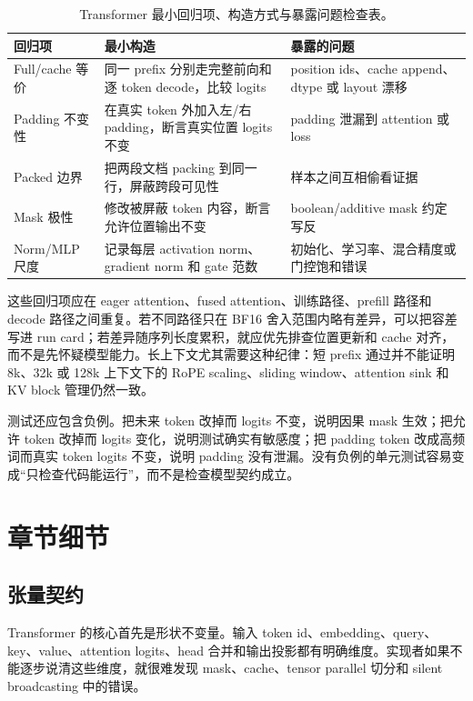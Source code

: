 \documentclass[UTF8,zihao=-4,openany]{ctexbook}
\begin{document}
\begin{table}[t]
\centering
\small
\begin{tabular}{@{}>{\raggedright\arraybackslash}p{}>{\raggedright\arraybackslash}p{}>{\raggedright\arraybackslash}p{}@{}}
\toprule
回归项 & 最小构造 & 暴露的问题 \\
\midrule
Full/cache 等价 & 同一 prefix 分别走完整前向和逐 token decode，比较 logits & position ids、cache append、dtype 或 layout 漂移 \\
Padding 不变性 & 在真实 token 外加入左/右 padding，断言真实位置 logits 不变 & padding 泄漏到 attention 或 loss \\
Packed 边界 & 把两段文档 packing 到同一行，屏蔽跨段可见性 & 样本之间互相偷看证据 \\
Mask 极性 & 修改被屏蔽 token 内容，断言允许位置输出不变 & boolean/additive mask 约定写反 \\
Norm/MLP 尺度 & 记录每层 activation norm、gradient norm 和 gate 范数 & 初始化、学习率、混合精度或门控饱和错误 \\
\bottomrule
\end{tabular}
\caption{Transformer 最小回归项、构造方式与暴露问题检查表。}
\label{tab:zh-transformer-regression-suite}
\end{table}

这些回归项应在 eager attention、fused attention、训练路径、prefill 路径和 decode 路径之间重复。若不同路径只在 BF16 舍入范围内略有差异，可以把容差写进 run card；若差异随序列长度累积，就应优先排查位置更新和 cache 对齐，而不是先怀疑模型能力。长上下文尤其需要这种纪律：短 prefix 通过并不能证明 8k、32k 或 128k 上下文下的 RoPE scaling、sliding window、attention sink 和 KV block 管理仍然一致。

测试还应包含负例。把未来 token 改掉而 logits 不变，说明因果 mask 生效；把允许 token 改掉而 logits 变化，说明测试确实有敏感度；把 padding token 改成高频词而真实 token logits 不变，说明 padding 没有泄漏。没有负例的单元测试容易变成“只检查代码能运行”，而不是检查模型契约成立。

\section{章节细节}
\subsection{张量契约}
Transformer 的核心首先是形状不变量。输入 token id、embedding、query、key、value、attention logits、head 合并和输出投影都有明确维度。实现者如果不能逐步说清这些维度，就很难发现 mask、cache、tensor parallel 切分和 silent broadcasting 中的错误。
\end{document}
